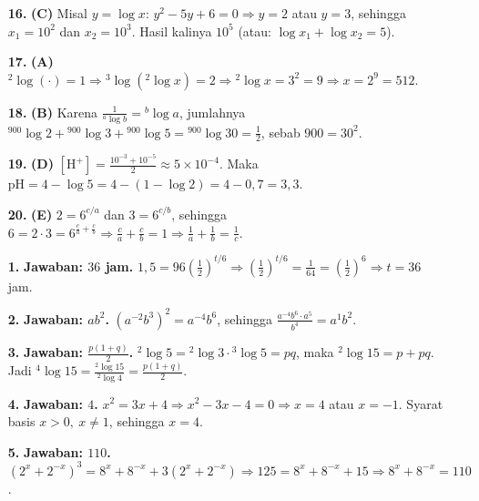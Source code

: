 \documentclass[a4paper,11pt]{article}
\newcommand{\dis}{\displaystyle}
\newcommand{\alog}[2]{{}^{#1}\!\log #2}
\newcounter{no}
\begin{document}
\begin{enumerate}[leftmargin=2em,itemsep=2pt,topsep=2pt]
\item[\textbf{16.}] \textbf{(C)} Misal $y=\log x$: $y^{2}-5y+6=0\Rightarrow y=2$ atau $y=3$, sehingga $x_{1}=10^{2}$ dan $x_{2}=10^{3}$. Hasil kalinya $10^{5}$ (atau: $\log x_1+\log x_2=5$).
\item[\textbf{17.}] \textbf{(A)} $\alog{2}{(\cdot)}=1\Rightarrow\alog{3}{(\alog{2}{x})}=2\Rightarrow\alog{2}{x}=3^{2}=9\Rightarrow x=2^{9}=512$.
\item[\textbf{18.}] \textbf{(B)} Karena $\dis\frac{1}{\alog{a}{b}}=\alog{b}{a}$, jumlahnya $\alog{900}{2}+\alog{900}{3}+\alog{900}{5}=\alog{900}{30}=\dis\frac12$, sebab $900=30^{2}$.
\item[\textbf{19.}] \textbf{(D)} $[\mathrm{H}^+]=\dis\frac{10^{-3}+10^{-5}}{2}\approx5\times10^{-4}$. Maka $\mathrm{pH}=4-\log5=4-(1-\log2)=4-0{,}7=3{,}3$.
\item[\textbf{20.}] \textbf{(E)} $2=6^{c/a}$ dan $3=6^{c/b}$, sehingga $6=2\cdot3=6^{\frac ca+\frac cb}\Rightarrow\dis\frac ca+\dis\frac cb=1\Rightarrow\dis\frac1a+\dis\frac1b=\dis\frac1c$.
\end{enumerate}
\par{}\par\vspace{0.2em}
\small\begin{enumerate}[leftmargin=2em,itemsep=2pt,topsep=2pt]
\item[\textbf{1.}] \textbf{Jawaban: $36$ jam.} $1{,}5=96\left(\dis\frac12\right)^{t/6}\Rightarrow\left(\dis\frac12\right)^{t/6}=\dis\frac1{64}=\left(\dis\frac12\right)^{6}\Rightarrow t=36$ jam.
\item[\textbf{2.}] \textbf{Jawaban: $ab^{2}$.} $(a^{-2}b^{3})^{2}=a^{-4}b^{6}$, sehingga $\dis\frac{a^{-4}b^{6}\cdot a^{5}}{b^{4}}=a^{1}b^{2}$.
\item[\textbf{3.}] \textbf{Jawaban: $\dis\frac{p(1+q)}{2}$.} $\alog{2}{5}=\alog{2}{3}\cdot\alog{3}{5}=pq$, maka $\alog{2}{15}=p+pq$. Jadi $\alog{4}{15}=\dis\frac{\alog{2}{15}}{\alog{2}{4}}=\dis\frac{p(1+q)}{2}$.
\item[\textbf{4.}] \textbf{Jawaban: $4$.} $x^{2}=3x+4\Rightarrow x^{2}-3x-4=0\Rightarrow x=4$ atau $x=-1$. Syarat basis $x>0,\ x\neq1$, sehingga $x=4$.
\item[\textbf{5.}] \textbf{Jawaban: $110$.} $(2^{x}+2^{-x})^{3}=8^{x}+8^{-x}+3(2^{x}+2^{-x})\Rightarrow125=8^{x}+8^{-x}+15\Rightarrow8^{x}+8^{-x}=110$.
\end{enumerate}
\end{document}
